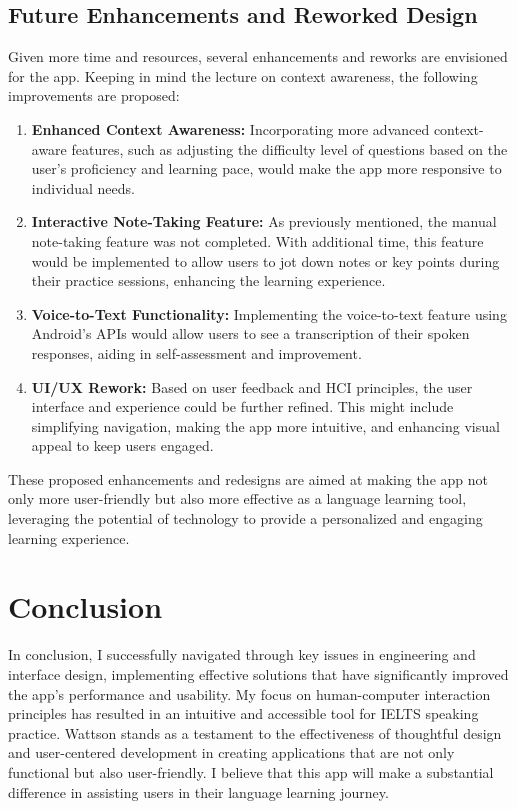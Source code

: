 \documentclass[conference,10pt,letterpaper]{IEEEtran}
\begin{document}
	\subsection{Future Enhancements and Reworked Design}
	Given more time and resources, several enhancements and reworks are envisioned for the app. Keeping in mind the lecture on context awareness, the following improvements are proposed:
	\begin{enumerate}
		\item \textbf{Enhanced Context Awareness:} Incorporating more advanced context-aware features, such as adjusting the difficulty level of questions based on the user's proficiency and learning pace, would make the app more responsive to individual needs.
		
		\item \textbf{Interactive Note-Taking Feature:} As previously mentioned, the manual note-taking feature was not completed. With additional time, this feature would be implemented to allow users to jot down notes or key points during their practice sessions, enhancing the learning experience.
		\item \textbf{Voice-to-Text Functionality:} Implementing the voice-to-text feature using Android's APIs would allow users to see a transcription of their spoken responses, aiding in self-assessment and improvement.
		\item \textbf{UI/UX Rework:} Based on user feedback and HCI principles, the user interface and experience could be further refined. This might include simplifying navigation, making the app more intuitive, and enhancing visual appeal to keep users engaged.
	\end{enumerate}
	
	These proposed enhancements and redesigns are aimed at making the app not only more user-friendly but also more effective as a language learning tool, leveraging the potential of technology to provide a personalized and engaging learning experience.
	
	\section{Conclusion}
	In conclusion, I successfully navigated through key issues in engineering and interface design, implementing effective solutions that have significantly improved the app's performance and usability. My focus on human-computer interaction principles has resulted in an intuitive and accessible tool for IELTS speaking practice. Wattson stands as a testament to the effectiveness of thoughtful design and user-centered development in creating applications that are not only functional but also user-friendly. I believe that this app will make a substantial difference in assisting users in their language learning journey.
	
\end{document}

